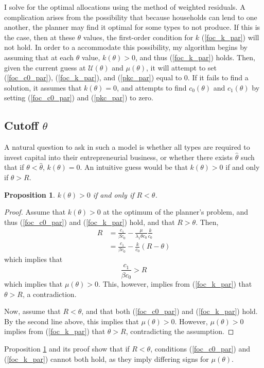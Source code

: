 \documentclass[11pt]{article}
\newcommand{\U}{\mathcal{U}}
\newtheorem{proposition}{Proposition}
\begin{document}
I solve for the optimal allocations using the method of weighted residuals. A complication arises from the possibility that because households can lend to one another, the planner may find it optimal for some types to not produce. If this is the case, then at these \( \theta \) values, the first-order condition for \( k \) (\ref{foc_k_par}) will not hold. In order to a accommodate this possibility, my algorithm begins by assuming that at each \( \theta \) value, \( k(\theta) > 0 \), and thus (\ref{foc_k_par}) holds. Then, given the current guess at \( \U(\theta) \) and \( \mu(\theta) \), it will attempt to set (\ref{foc_c0_par}), (\ref{foc_k_par}), and (\ref{pkc_par}) equal to 0. If it fails to find a solution, it assumes that \( k(\theta) = 0 \), and attempts to find \( c_0(\theta) \) and \( c_1(\theta) \) by setting (\ref{foc_c0_par}) and (\ref{pkc_par}) to zero. 

\subsection{Cutoff \( \theta \)} \label{s1_cutoff}

A natural question to ask in such a model is whether all types are required to invest capital into their entrepreneurial business, or whether there exists \( \hat{\theta} \) such that if \( \theta < \hat{\theta} \), \( k(\theta) = 0 \). An intuitive guess would be that \( k(\theta) > 0 \) if and only if \( \theta > R \). 

\begin{proposition} \label{prop_k}
    \( k(\theta) > 0 \) if and only if \( R < \theta \).
\end{proposition}
\begin{proof}
    Assume that \( k(\theta) > 0 \) at the optimum of the planner's problem, and thus (\ref{foc_c0_par}) and (\ref{foc_k_par}) hold, and that \( R > \theta \). Then,
    \begin{align*}
        R &= \frac{c_1}{\beta c_0} - \frac{\mu}{\lambda_1\theta c_0}\frac{k}{c_0} \\
        &= \frac{c_1}{\beta c_0} - \frac{k}{c_0} (R - \theta)
    \end{align*}
    which implies that 
    \[\frac{c_1}{\beta c_0} > R \]
    which implies that \( \mu(\theta) > 0 \). This, however, implies from (\ref{foc_k_par}) that \( \theta > R \), a contradiction. 

    Now, assume that \( R < \theta \), and that both (\ref{foc_c0_par}) and (\ref{foc_k_par}) hold. By the second line above, this implies that \( \mu(\theta) > 0 \). However, \( \mu(\theta) > 0 \) implies from (\ref{foc_k_par}) that \( \theta > R \), contradicting the assumption. 
\end{proof}
Proposition \ref{prop_k} and its proof show that if \( R < \theta \), conditions (\ref{foc_c0_par}) and (\ref{foc_k_par}) cannot both hold, as they imply differing signs for \( \mu(\theta) \). 
    
\end{document}
